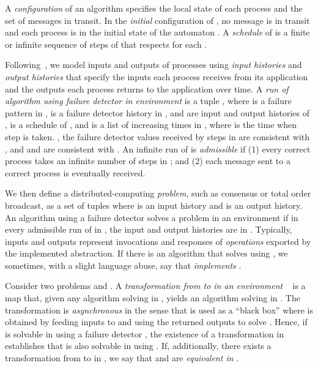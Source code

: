 \documentclass[11pt]{article}
\begin{document}
A \emph{configuration} of an algorithm  specifies the local
state of each process and the set of messages in transit.
In the \emph{initial} configuration of , no message is in
transit and each process  is in the initial state of the automaton .
A \emph{schedule}  of  is a finite or infinite sequence of
steps of  that respects   for each .

Following~\cite{JT08}, we model inputs and outputs of processes using \emph{input histories}
 and \emph{output histories}  that specify the inputs each
process receives from its application and
the outputs each process returns to the application over time.
A \emph{run of algorithm  using failure detector  in
  environment } is
        a tuple , where  is a failure pattern in ,
         is a failure detector history in ,
         and  are input and output histories of ,
         is a schedule of , and
         is a list of increasing times in ,
        where  is the time when step  is taken.
        , the failure detector values received by steps
        in  are consistent with , and  and  are
        consistent with .
An infinite run of  is \emph{admissible}
if (1) every correct process takes an infinite number of steps in ;
        and (2) each message sent to a correct process is eventually received.






We then define a distributed-computing \emph{problem}, such as consensus or total
order broadcast, as a set of tuples  where  is an
input history and  is an output history.
An algorithm  using a failure detector  solves a problem  in
an environment   if
in every admissible run of  in , the input and output histories
are in .
Typically, inputs and outputs represent
invocations and responses of \emph{operations} exported by the
implemented abstraction.
If there is an algorithm that solves  using , we sometimes,
with a slight language abuse, say that  \emph{implements} .


Consider two problems  and . A \emph{transformation from  to
   in an environment }~\cite{HT94}  is
  a map  that, given any algorithm 
  solving  in , yields an algorithm   solving  in
  .
The transformation is \emph{asynchronous} in the sense that 
is used as a ``black box'' where  is
obtained by feeding inputs to  and using the returned outputs to
solve .
Hence, if  is solvable in  using a failure detector ,
the existence of a transformation  in  establishes
that  is also solvable in  using .
If, additionally, there exists a transformation from  to   in , we
say that  and  are \emph{equivalent in }.
\end{document}

